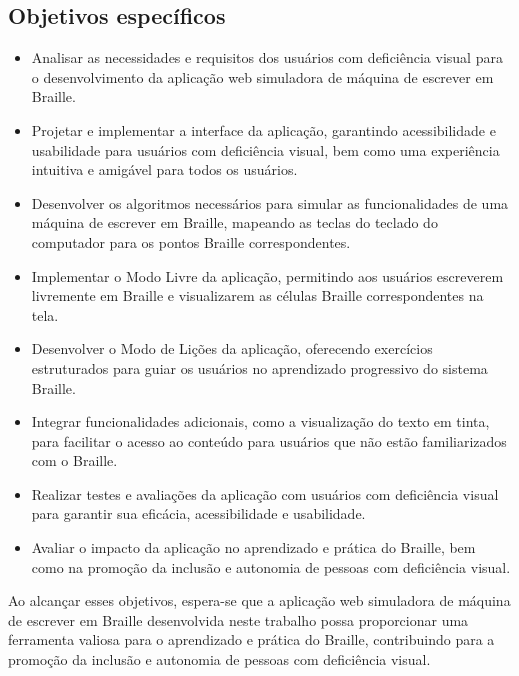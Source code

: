 \subsection{Objetivos específicos}

\begin{itemize}
    \item Analisar as necessidades e requisitos dos usuários com deficiência visual para o desenvolvimento da aplicação web simuladora de máquina de escrever em Braille.

    \item Projetar e implementar a interface da aplicação, garantindo acessibilidade e usabilidade para usuários com deficiência visual, bem como uma experiência intuitiva e amigável para todos os usuários.

    \item Desenvolver os algoritmos necessários para simular as funcionalidades de uma máquina de escrever em Braille, mapeando as teclas do teclado do computador para os pontos Braille correspondentes.

    \item Implementar o Modo Livre da aplicação, permitindo aos usuários escreverem livremente em Braille e visualizarem as células Braille correspondentes na tela.

    \item Desenvolver o Modo de Lições da aplicação, oferecendo exercícios estruturados para guiar os usuários no aprendizado progressivo do sistema Braille.

    \item Integrar funcionalidades adicionais, como a visualização do texto em tinta, para facilitar o acesso ao conteúdo para usuários que não estão familiarizados com o Braille.

    \item Realizar testes e avaliações da aplicação com usuários com deficiência visual para garantir sua eficácia, acessibilidade e usabilidade.

    \item Avaliar o impacto da aplicação no aprendizado e prática do Braille, bem como na promoção da inclusão e autonomia de pessoas com deficiência visual.

\end{itemize}

Ao alcançar esses objetivos, espera-se que a aplicação web simuladora de máquina de escrever em Braille desenvolvida neste trabalho possa proporcionar uma ferramenta valiosa para o aprendizado e prática do Braille, contribuindo para a promoção da inclusão e autonomia de pessoas com deficiência visual.

